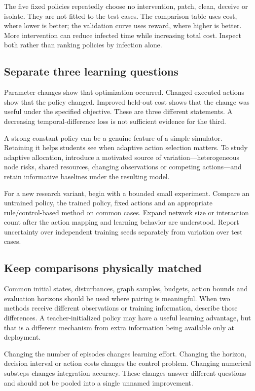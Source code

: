 \documentclass[11pt,a4paper]{article}
\theoremstyle{definition}
\theoremstyle{remark}
\begin{document}
The five fixed policies repeatedly choose no intervention, patch, clean, deceive or isolate. They are not fitted to the test cases. The comparison table uses cost, where lower is better; the validation curve uses reward, where higher is better. More intervention can reduce infected time while increasing total cost. Inspect both rather than ranking policies by infection alone.

\subsection{Separate three learning questions}
Parameter changes show that optimization occurred. Changed executed actions show that the policy changed. Improved held-out cost shows that the change was useful under the specified objective. These are three different statements. A decreasing temporal-difference loss is not sufficient evidence for the third.

A strong constant policy can be a genuine feature of a simple simulator. Retaining it helps students see when adaptive action selection matters. To study adaptive allocation, introduce a motivated source of variation---heterogeneous node risks, shared resources, changing observations or competing actions---and retain informative baselines under the resulting model.

For a new research variant, begin with a bounded small experiment. Compare an untrained policy, the trained policy, fixed actions and an appropriate rule/control-based method on common cases. Expand network size or interaction count after the action mapping and learning behavior are understood. Report uncertainty over independent training seeds separately from variation over test cases.

\subsection{Keep comparisons physically matched}
Common initial states, disturbances, graph samples, budgets, action bounds and evaluation horizons should be used where pairing is meaningful. When two methods receive different observations or training information, describe those differences. A teacher-initialized policy may have a useful learning advantage, but that is a different mechanism from extra information being available only at deployment.

Changing the number of episodes changes learning effort. Changing the horizon, decision interval or action costs changes the control problem. Changing numerical substeps changes integration accuracy. These changes answer different questions and should not be pooled into a single unnamed improvement.
\end{document}
